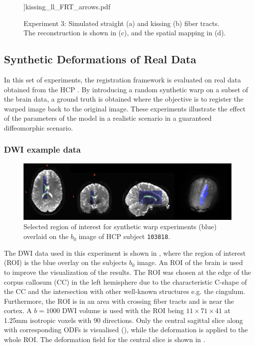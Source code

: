 \documentclass[twocolumn]{svjour3}
\begin{document}
\begin{figure}[!t]
{    \columnwidth]{kissing_ll_FRT_arrows.pdf}}
  \caption{Experiment 3: Simulated straight (a) and kissing (b) fiber tracts. The
    reconstruction is shown in (c), and the spatial mapping in (d).}
  \label{fig:straight2kiss_results}
\end{figure}


\subsection{Synthetic Deformations of Real Data}
\label{sec:syndeform}

In this set of experiments, the registration framework is evaluated on real data obtained
from the HCP \cite{van2013wu}. By introducing a random synthetic warp on a subset of the
brain data, a ground truth is obtained where the objective is to register the warped image
back to the original image. These experiments illustrate the effect of the parameters of
the model in a realistic scenario in a guaranteed diffeomorphic
scenario.

\subsubsection{DWI example data}

\begin{figure}[H]
  \centering
  \includegraphics[width=1\columnwidth]{B0_roi_overlay.png}
  \caption{Selected region of interest for synthetic warp experiments (blue) overlaid on
    the $b_0$ image of HCP subject \texttt{103818}.}
  \label{fig:cc_roi_b0}
\end{figure}
The DWI data used in this experiment is shown in , where the region of
interest (ROI) is the blue overlay on the subjects $b_0$ image. An ROI of the brain is
used to improve the visualization of the results. The ROI was chosen at the edge of the
corpus callosum (CC) in the left hemisphere due to the characteristic C-shape of the CC
and the intersection with other well-known structures e.g. the cingulum. Furthermore, the
ROI is in an area with crossing fiber tracts and is near the cortex. A $b=1000$ DWI volume
is used with the ROI being $11\times71\times41$ at 1.25mm isotropic voxels with 90
directions. Only the central sagittal slice along with corresponding ODFs is visualised
(), while the deformation is applied to the whole ROI. The
deformation field for the central slice is shown in .
\end{document}
